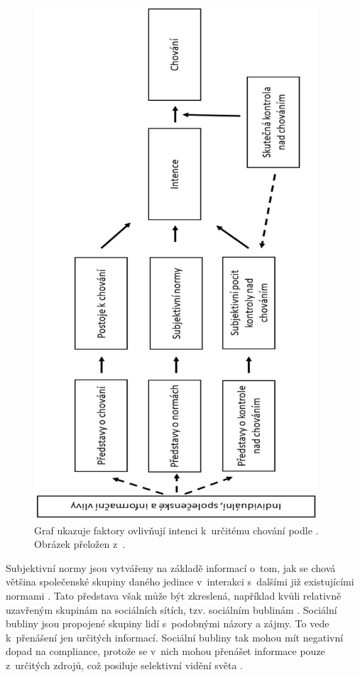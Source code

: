 \begin{figure}
\begin{center}
    \includegraphics[angle=270,width=300pt]{./pic/Ajzen2-cs.eps}
    
    \caption{Graf ukazuje faktory ovlivňují intenci k~určitému chování podle . Obrázek přeložen z~\cite{Ajzen2018}.}
    \label{fig:graph}
\end{center}
\end{figure}

Subjektivní normy jsou vytvářeny na základě informací o~tom, jak se chová většina společenské skupiny daného jedince v~interakci s~dalšími již existujícími normami \cite{Ajzen1991}. Tato představa však může být zkreslená, například kvůli relativně uzavřeným skupinám na sociálních sítích, tzv. sociálním bublinám \cite{Gonzalez-Padilla2020}. Sociální bubliny jsou propojené skupiny lidí s~podobnými názory a zájmy. To vede k~přenášení jen určitých informací. Sociální bubliny tak mohou mít negativní dopad na compliance, protože se v~nich mohou přenášet informace pouze z~určitých zdrojů, což posiluje selektivní vidění světa \cite{Gonzalez-Padilla2020,Pariser2012TheFB}. 

